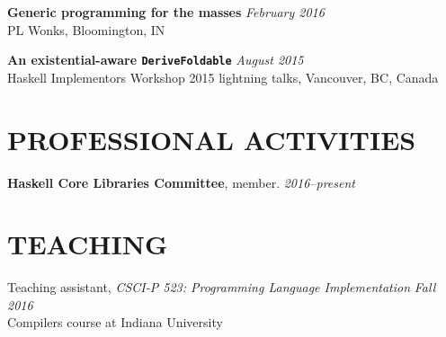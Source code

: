 \documentclass{res}
\begin{document}
\begin{resume}
    \textbf{Generic programming for the masses} \hfill \textit{February 2016} \\
    PL Wonks, Bloomington, IN

    \textbf{An existential-aware \texttt{DeriveFoldable}} \hfill \textit{August 2015} \\
    Haskell Implementors Workshop 2015 lightning talks, Vancouver, BC, Canada

\section{PROFESSIONAL ACTIVITIES}
    \textbf{Haskell Core Libraries Committee}, member. \hfill \textit{2016--present}

\section{TEACHING}
    Teaching assistant, \textit{CSCI-P 523: Programming Language Implementation} \hfill \textit{Fall 2016} \\
    Compilers course at Indiana University

\end{resume}
\end{document}
